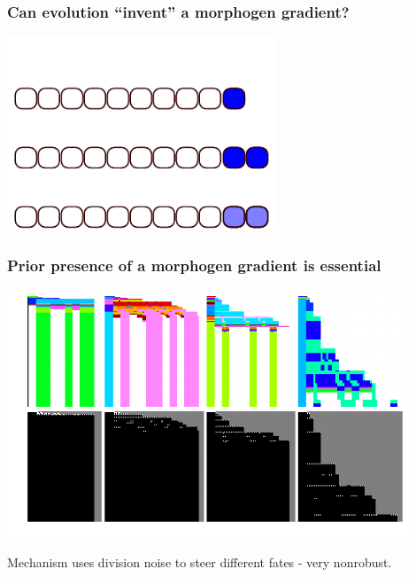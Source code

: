 \documentclass[compress]{beamer}
\begin{document}
\begin{frame}
    \frametitle{Can evolution ``invent'' a morphogen gradient?}
    \begin{center}
     \includegraphics[width=0.6\textwidth]{figures/freemorph_initial.pdf}\\
    \end{center}
\end{frame}

\begin{frame}
    \frametitle{Prior presence of a morphogen gradient is essential}
    \begin{center}
     \includegraphics[width=0.9\textwidth]{figures/simultaneous_freemorph.pdf}\\
    \end{center}
    Mechanism uses division noise to steer different fates - very nonrobust.
\end{frame}
\end{document}
